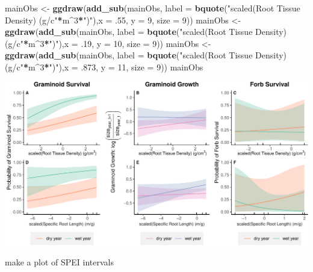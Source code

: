\documentclass[
]{article}
\newenvironment{Shaded}{\begin{snugshade}}{\end{snugshade}}
\newcommand{\DataTypeTok}[1]{\textcolor[rgb]{0.13,0.29,0.53}{#1}}
\newcommand{\DecValTok}[1]{\textcolor[rgb]{0.00,0.00,0.81}{#1}}
\newcommand{\FloatTok}[1]{\textcolor[rgb]{0.00,0.00,0.81}{#1}}
\newcommand{\KeywordTok}[1]{\textcolor[rgb]{0.13,0.29,0.53}{\textbf{#1}}}
\newcommand{\NormalTok}[1]{#1}
\newcommand{\OperatorTok}[1]{\textcolor[rgb]{0.81,0.36,0.00}{\textbf{#1}}}
\newcommand{\StringTok}[1]{\textcolor[rgb]{0.31,0.60,0.02}{#1}}
\begin{document}
\begin{Shaded}
\begin{Highlighting}[]
\NormalTok{mainObs \textless{}{-}}\StringTok{ }\KeywordTok{ggdraw}\NormalTok{(}\KeywordTok{add\_sub}\NormalTok{(mainObs, }\DataTypeTok{label =} \KeywordTok{bquote}\NormalTok{(}\StringTok{"scaled(Root Tissue Density) (g/c"}\OperatorTok{*}\NormalTok{m}\OperatorTok{\^{}}\DecValTok{3}\OperatorTok{*}\StringTok{")"}\NormalTok{),}\DataTypeTok{x =} \FloatTok{.55}\NormalTok{, }\DataTypeTok{y =} \DecValTok{9}\NormalTok{, }\DataTypeTok{size =} \DecValTok{9}\NormalTok{))}
\NormalTok{mainObs \textless{}{-}}\StringTok{ }\KeywordTok{ggdraw}\NormalTok{(}\KeywordTok{add\_sub}\NormalTok{(mainObs, }\DataTypeTok{label =} \KeywordTok{bquote}\NormalTok{(}\StringTok{"scaled(Root Tissue Density) (g/c"}\OperatorTok{*}\NormalTok{m}\OperatorTok{\^{}}\DecValTok{3}\OperatorTok{*}\StringTok{")"}\NormalTok{),}\DataTypeTok{x =} \FloatTok{.19}\NormalTok{, }\DataTypeTok{y =} \DecValTok{10}\NormalTok{, }\DataTypeTok{size =} \DecValTok{9}\NormalTok{))}
\NormalTok{mainObs \textless{}{-}}\StringTok{ }\KeywordTok{ggdraw}\NormalTok{(}\KeywordTok{add\_sub}\NormalTok{(mainObs, }\DataTypeTok{label =} \KeywordTok{bquote}\NormalTok{(}\StringTok{"scaled(Root Tissue Density) (g/c"}\OperatorTok{*}\NormalTok{m}\OperatorTok{\^{}}\DecValTok{3}\OperatorTok{*}\StringTok{")"}\NormalTok{),}\DataTypeTok{x =} \FloatTok{.873}\NormalTok{, }\DataTypeTok{y =} \DecValTok{11}\NormalTok{, }\DataTypeTok{size =} \DecValTok{9}\NormalTok{))}
\NormalTok{mainObs}
\end{Highlighting}
\end{Shaded}

\includegraphics{figures/suppObservationsFig-1.pdf}

make a plot of SPEI intervals
\end{document}
